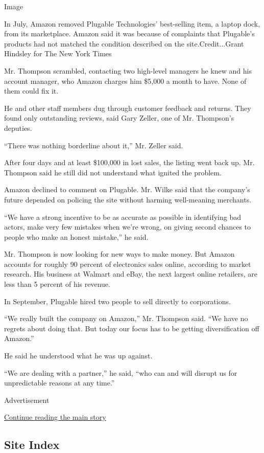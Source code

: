 Image

In July, Amazon removed Plugable Technologies' best-selling item, a
laptop dock, from its marketplace. Amazon said it was because of
complaints that Plugable's products had not matched the condition
described on the site.Credit...Grant Hindsley for The New York Times

Mr. Thompson scrambled, contacting two high-level managers he knew and
his account manager, who Amazon charges him \$5,000 a month to have.
None of them could fix it.

He and other staff members dug through customer feedback and returns.
They found only outstanding reviews, said Gary Zeller, one of Mr.
Thompson's deputies.

``There was nothing borderline about it,'' Mr. Zeller said.

After four days and at least \$100,000 in lost sales, the listing went
back up. Mr. Thompson said he still did not understand what ignited the
problem.

Amazon declined to comment on Plugable. Mr. Wilke said that the
company's future depended on policing the site without harming
well-meaning merchants.

``We have a strong incentive to be as accurate as possible in
identifying bad actors, make very few mistakes when we're wrong, on
giving second chances to people who make an honest mistake,'' he said.

Mr. Thompson is now looking for new ways to make money. But Amazon
accounts for roughly 90 percent of electronics sales online, according
to market research. His business at Walmart and eBay, the next largest
online retailers, are less than 5 percent of his revenue.

In September, Plugable hired two people to sell directly to
corporations.

``We really built the company on Amazon,'' Mr. Thompson said. ``We have
no regrets about doing that. But today our focus has to be getting
diversification off Amazon.''

He said he understood what he was up against.

``We are dealing with a partner,'' he said, ``who can and will disrupt
us for unpredictable reasons at any time.''

Advertisement

\protect\hyperlink{after-bottom}{Continue reading the main story}

\hypertarget{site-index}{%
\subsection{Site Index}\label{site-index}}

